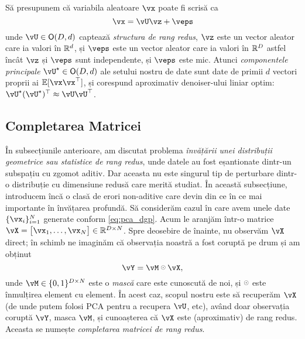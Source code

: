 \documentclass[../../book-main_ro.tex]{subfiles}
\begin{document}
\begin{theorem}\label{thm:ppca}
    Să presupunem că variabila aleatoare \(\vx\) poate fi scrisă ca
    \begin{equation}
        \vx = \vU\vz + \veps
    \end{equation}
    unde \(\vU \in \O(D, d)\) captează \textit{structura de rang redus}, \(\vz\)
    este un vector aleator care ia valori în \(\mathbb{R}^{d}\), și \(\veps\) este un vector
    aleator care ia valori în \(\mathbb{R}^{D}\) astfel încât \(\vz\) și \(\veps\) sunt
    independente, și \(\veps\) este mic. Atunci \textit{componentele principale}
    \(\vU^{\star} \in \O(D, d)\) ale setului nostru de date sunt date de primii \(d\)
    vectori proprii ai \(\Ex[\vx\vx^{\top}]\), și corespund aproximativ
    denoiser-ului liniar optim: \(\vU^{\star}(\vU^{\star})^{\top} \approx \vU\vU^{\top}\).
\end{theorem}



\subsection{Completarea Matricei}

În subsecțiunile anterioare, am discutat problema \textit{învățării unei distribuții geometrice sau statistice de rang redus}, unde datele au fost eșantionate dintr-un subspațiu cu zgomot aditiv. Dar aceasta nu este singurul tip de perturbare dintr-o distribuție cu dimensiune redusă care merită studiat. În această subsecțiune, introducem încă o clasă de erori non-aditive care devin din ce în ce mai importante în învățarea profundă. Să considerăm cazul în care avem unele date \(\{\vx_{i}\}_{i = 1}^{N}\) generate conform \eqref{eq:pca_dgp}. Acum le aranjăm într-o matrice \(\vX = \mat{\vx_{1}, \dots, \vx_{N}} \in \R^{D \times N}\). Spre deosebire de înainte, nu observăm \(\vX\) direct; în schimb ne imaginăm că observația noastră a fost coruptă pe drum și am obținut 
\begin{equation}
    \vY = \vM \hada \vX,
\end{equation}
unde \(\vM \in \{0, 1\}^{D \times N}\) este o \textit{mască} care este cunoscută de noi,
și \(\hada\) este înmulțirea element cu element. În acest caz, scopul nostru este să recuperăm \(\vX\) (de unde putem folosi PCA pentru a recupera \(\vU\), etc), având doar observația coruptă \(\vY\), masca \(\vM\), și cunoașterea că \(\vX\) este (aproximativ) de rang redus. Aceasta se numește \textit{completarea matricei de rang redus}.
\end{document}
